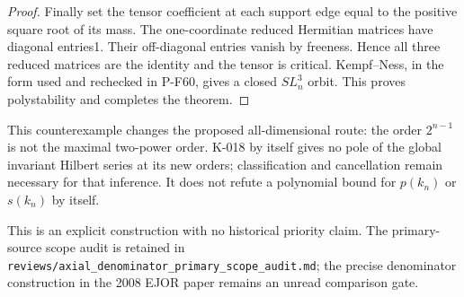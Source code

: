 \begin{proof}
Finally set the tensor coefficient at each support edge equal to
the positive square root of its mass.  The one-coordinate reduced
Hermitian matrices have diagonal entries1.  Their off-diagonal
entries vanish by freeness.  Hence all three reduced matrices are
the identity and the tensor is critical.  Kempf--Ness, in the form
used and rechecked in P-F60, gives a closed $SL_n^3$ orbit.
This proves polystability and completes the theorem.
\end{proof}

This counterexample changes the proposed all-dimensional route:
the order $2^{n-1}$ is not the maximal two-power order.  K-018 by
itself gives no pole of the global invariant Hilbert series at its
new orders; classification and cancellation remain necessary for
that inference.  It does not refute a polynomial bound for
$p(k_n)$ or $s(k_n)$ by itself.

This is an explicit construction with no historical priority claim.
The primary-source scope audit is retained in
\texttt{reviews/axial\_denominator\_primary\_scope\_audit.md};
the precise denominator construction in the 2008 EJOR paper remains
an unread comparison gate.
